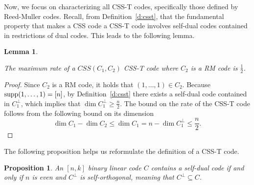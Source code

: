 \documentclass{amsart}
\newtheorem{proposition}[theorem]{Proposition}
\newtheorem{lemma}[theorem]{Lemma}
\theoremstyle{definition}
\newtheorem{remark}[theorem]{Remark}
\newcommand{\N}{{\mathbb{N}}}
\newcommand{\supp}{\textnormal{supp}}
\newcommand{\CSS}{\textnormal{CSS}}
\begin{document}



Now, we focus on characterizing all CSS-T codes, specifically those defined by Reed-Muller codes. Recall, from Definition~\ref{d:csst}, that the fundamental property that makes a CSS code a CSS-T code involves self-dual codes contained in restrictions of dual codes. This leads to the following lemma. 

\begin{lemma}\label{l:rate} %


 The maximum rate of a $CSS(C_1,C_2)$ CSS-T code where  $C_2$ is a RM code is $\frac{1}2$.
 \end{lemma}

\begin{proof}
    Since $C_2$ is a RM code, it holds that $(1,\dots,1)\in C_2$. Because $\supp(1,\dots,1)=[n]$, by Definition~\ref{d:csst} there exists a self-dual code contained in $C_1^\perp$, which implies that $\dim C_1^\perp \geq \frac{n}{2}$. The bound on the rate of the CSS-T code follows from the following bound on its dimension  
    \[\dim C_1-\dim C_2\leq \dim C_1 = n-\dim C_1^\perp \leq \frac{n}{2}.\]
\end{proof}








The following proposition helps us reformulate the definition of a CSS-T code.

\begin{proposition}\label{p:self-ort}
An $[n, k]$ binary linear code $C$ contains a self-dual code if and only if $n$ is even and $C^\perp$ is self-orthogonal, meaning that $C^\perp\subseteq C$.
\end{proposition}
\end{document}
